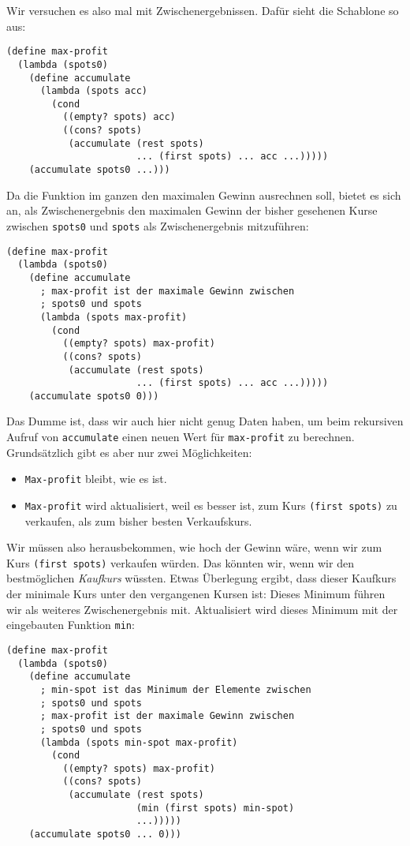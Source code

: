 Wir versuchen es also mal mit Zwischenergebnissen.  Dafür sieht die
Schablone so aus:
%
\begin{lstlisting}
(define max-profit
  (lambda (spots0)
    (define accumulate
      (lambda (spots acc)
        (cond
          ((empty? spots) acc)
          ((cons? spots)
           (accumulate (rest spots)
                       ... (first spots) ... acc ...)))))
    (accumulate spots0 ...)))
\end{lstlisting}
%
Da die Funktion im ganzen den maximalen Gewinn ausrechnen soll, bietet
es sich an, als Zwischenergebnis den maximalen Gewinn der bisher
gesehenen Kurse zwischen \lstinline{spots0} und \lstinline{spots} als
Zwischenergebnis mitzuführen:
%
\begin{lstlisting}
(define max-profit
  (lambda (spots0)
    (define accumulate
      ; max-profit ist der maximale Gewinn zwischen
      ; spots0 und spots
      (lambda (spots max-profit)
        (cond
          ((empty? spots) max-profit)
          ((cons? spots)
           (accumulate (rest spots)
                       ... (first spots) ... acc ...)))))
    (accumulate spots0 0)))
\end{lstlisting}
%
Das Dumme ist, dass wir auch hier nicht genug Daten haben, um beim
rekursiven Aufruf von \lstinline{accumulate} einen neuen Wert für
\lstinline{max-profit} zu berechnen.  Grundsätzlich gibt es aber nur
zwei Möglichkeiten:
%
\begin{itemize}
\item \lstinline{Max-profit} bleibt, wie es ist.
\item \lstinline{Max-profit} wird aktualisiert, weil es besser ist,
  zum Kurs \lstinline{(first spots)} zu verkaufen, als zum bisher
  besten Verkaufskurs.
\end{itemize}
%
Wir müssen also herausbekommen, wie hoch der Gewinn wäre, wenn wir zum
Kurs \lstinline{(first spots)} verkaufen würden.  Das könnten wir,
wenn wir den bestmöglichen \emph{Kaufkurs} wüssten.  Etwas Überlegung
ergibt, dass dieser Kaufkurs der minimale Kurs unter den vergangenen
Kursen ist: Dieses Minimum führen wir als weiteres Zwischenergebnis
mit.  Aktualisiert wird dieses Minimum mit der eingebauten Funktion
\lstinline{min}:
%
\begin{lstlisting}
(define max-profit
  (lambda (spots0)
    (define accumulate
      ; min-spot ist das Minimum der Elemente zwischen
      ; spots0 und spots
      ; max-profit ist der maximale Gewinn zwischen
      ; spots0 und spots
      (lambda (spots min-spot max-profit)
        (cond
          ((empty? spots) max-profit)
          ((cons? spots)
           (accumulate (rest spots)
                       (min (first spots) min-spot)
                       ...)))))
    (accumulate spots0 ... 0)))
\end{lstlisting}

